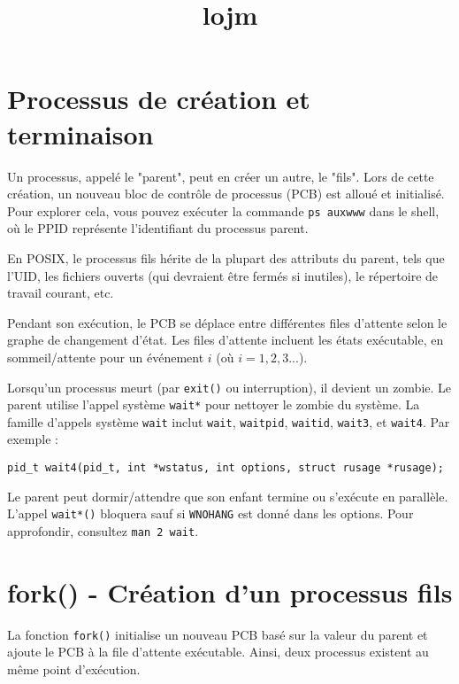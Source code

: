 \documentclass[12pt]{article}
\title{lojm}
\author{}
\date{}
\begin{document}
\maketitle
\tableofcontents
\newpage

\section{Processus de création et terminaison}

Un processus, appelé le "parent", peut en créer un autre, le "fils". Lors de cette création, un nouveau bloc de contrôle de processus (PCB) est alloué et initialisé. Pour explorer cela, vous pouvez exécuter la commande \texttt{ps auxwww} dans le shell, où le PPID représente l'identifiant du processus parent.

\begin{tcolorbox}[title={À retenir}]
En POSIX, le processus fils hérite de la plupart des attributs du parent, tels que l'UID, les fichiers ouverts (qui devraient être fermés si inutiles), le répertoire de travail courant, etc.
\end{tcolorbox}

Pendant son exécution, le PCB se déplace entre différentes files d'attente selon le graphe de changement d'état. Les files d'attente incluent les états exécutable, en sommeil/attente pour un événement \(i\) (où \(i=1,2,3...\)).

Lorsqu'un processus meurt (par \texttt{exit()} ou interruption), il devient un zombie. Le parent utilise l'appel système \texttt{wait*} pour nettoyer le zombie du système. La famille d'appels système \texttt{wait} inclut \texttt{wait}, \texttt{waitpid}, \texttt{waitid}, \texttt{wait3}, et \texttt{wait4}. Par exemple :

\begin{lstlisting}
pid_t wait4(pid_t, int *wstatus, int options, struct rusage *rusage);
\end{lstlisting}

Le parent peut dormir/attendre que son enfant termine ou s'exécute en parallèle. L'appel \texttt{wait*()} bloquera sauf si \texttt{WNOHANG} est donné dans les options. Pour approfondir, consultez \texttt{man 2 wait}.

\section{fork() - Création d'un processus fils}

La fonction \texttt{fork()} initialise un nouveau PCB basé sur la valeur du parent et ajoute le PCB à la file d'attente exécutable. Ainsi, deux processus existent au même point d'exécution.
\end{document}
